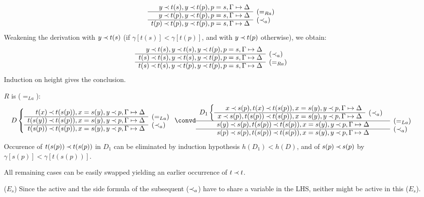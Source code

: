 \begin{PROOF}
\begin{LS}
\begin{LSA}
\[ \begin{array}{rl}
 y\Incl t(s), y\Incl t(p), p=s, \GSD \\ \cline{1-1}
 y\Incl t(p), y\Incl t(p), p=s, \GSD & \rabove{(=_{Ra})} \\ \cline{1-1}
 t(p)\Incl t(p), y\Incl t(p), p=s, \GSD & \rabove{(\Incl_a)} \end{array} \]
Weakening the derivation  with $y\mathbin{\prec} t(s)$ (if $\gamma[t(s)]<\gamma[t(p)]$,
and with $y\mathbin{\prec} t(p)$ otherwise), we obtain:
\[ \begin{array}{rl}
y\Incl t(s), y\Incl t(s), y\Incl t(p), p=s, \GSD \\ \cline{1-1}
 t(s)\Incl t(s), y\Incl t(s), y\Incl t(p), p=s, \GSD & \rabove{(\Incl_a)} \\ \cline{1-1}
 t(s)\Incl t(s), y\Incl t(p), y\Incl t(p), p=s, \GSD & \rabove{(=_{Ra})} \end{array} \]
Induction on height gives the conclusion. 
%
\item $R$ is ($=_{La}$):
\[ D \left \{ \begin{array}{rl}
t(x)\Incl t(s(p)), x=s(y), y\Incl p, \GSD \\ \cline{1-1}
t(s(y))\Incl t(s(p)), x=s(y), y\Incl p, \GSD & \rabove{(=_{La})} \\
\cline{1-1}
t(s(p))\Incl t(s(p)), x=s(y), y\Incl p, \GSD & \rabove{(\Incl_a)} \end{array}
\right . \convd
 \begin{array}{cl}
D_1 \left \{ \begin{array}{rl}
x\Incl s(p), t(x)\Incl t(s(p)), x=s(y), y\Incl p, \GSD \\ \cline{1-1}
x\Incl s(p), t(s(p))\Incl t(s(p)), x=s(y), y\Incl p, \GSD & \rabove{(\Incl_a)} \end{array}
\right . \\ \cline{1-1}
s(y)\Incl s(p), t(s(p))\Incl t(s(p)), x=s(y), y\Incl p, \GSD &
\rabove{(=_{La})} \\ \cline{1-1}
s(p)\Incl s(p), t(s(p))\Incl t(s(p)), x=s(y), y\Incl p, \GSD &
\rabove{(\Incl_a)} \end{array} \]
Occurence of $t(s(p))\mathbin{\prec} t(s(p))$ in $D_1$ can be eliminated by induction
hypothesis $h(D_1)<h(D)$, and of $s(p)\mathbin{\prec} s(p)$ by $\gamma[s(p)] < \gamma[t(s(p))]$.
%
\item All remaining cases can be easily swapped yielding an earlier
occurrence of $t\mathbin{\prec} t$.

($E_s$) Since the active and the side formula of the subsequent
($\mathbin{\prec}_a$) have to share a variable in the LHS, neither might be active in this ($E_s$).


\end{LSA}
\end{LS}
\end{PROOF}
